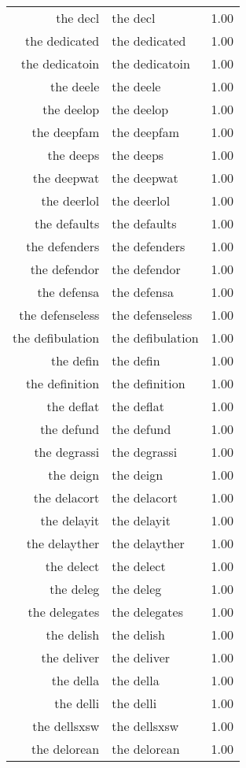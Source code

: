 \begin{table}[ht]
\begin{tabular}{rlr}
  the decl & the decl & 1.00 \\ 
  the dedicated & the dedicated & 1.00 \\ 
  the dedicatoin & the dedicatoin & 1.00 \\ 
  the deele & the deele & 1.00 \\ 
  the deelop & the deelop & 1.00 \\ 
  the deepfam & the deepfam & 1.00 \\ 
  the deeps & the deeps & 1.00 \\ 
  the deepwat & the deepwat & 1.00 \\ 
  the deerlol & the deerlol & 1.00 \\ 
  the defaults & the defaults & 1.00 \\ 
  the defenders & the defenders & 1.00 \\ 
  the defendor & the defendor & 1.00 \\ 
  the defensa & the defensa & 1.00 \\ 
  the defenseless & the defenseless & 1.00 \\ 
  the defibulation & the defibulation & 1.00 \\ 
  the defin & the defin & 1.00 \\ 
  the definition & the definition & 1.00 \\ 
  the deflat & the deflat & 1.00 \\ 
  the defund & the defund & 1.00 \\ 
  the degrassi & the degrassi & 1.00 \\ 
  the deign & the deign & 1.00 \\ 
  the delacort & the delacort & 1.00 \\ 
  the delayit & the delayit & 1.00 \\ 
  the delayther & the delayther & 1.00 \\ 
  the delect & the delect & 1.00 \\ 
  the deleg & the deleg & 1.00 \\ 
  the delegates & the delegates & 1.00 \\ 
  the delish & the delish & 1.00 \\ 
  the deliver & the deliver & 1.00 \\ 
  the della & the della & 1.00 \\ 
  the delli & the delli & 1.00 \\ 
  the dellsxsw & the dellsxsw & 1.00 \\ 
  the delorean & the delorean & 1.00 \\ 

\end{tabular}
\end{table}
